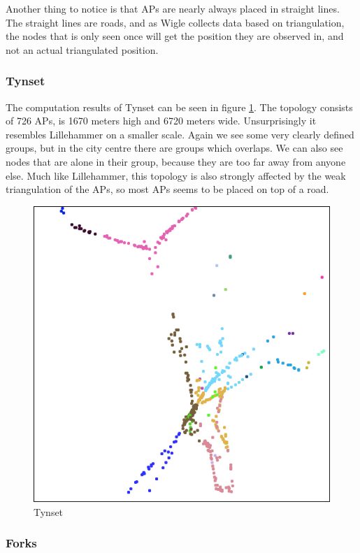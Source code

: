 Another thing to notice is that APs are nearly always placed in straight lines.
The straight lines are roads, and as Wigle collects data based on triangulation, the nodes
that is only seen once will get the position they are observed in, and not an actual
triangulated position. 
\subsubsection{Tynset}
The computation results of Tynset can be seen in figure \ref{fig:tynset_topo}. 
The topology consists of 726 APs, is 1670 meters high and  6720 meters wide. 
Unsurprisingly it resembles Lillehammer on a smaller scale.
Again we see
some very clearly defined groups, but in the city centre there are groups
which overlaps. We can also see nodes that are alone in their group,
because they are too far away from anyone else.
Much like Lillehammer, this topology is also strongly affected by the weak
triangulation of the APs, so most APs seems to be placed on top of a road. 

\begin{figure}
\center
\includegraphics[scale=0.46]{Images/cities/tynset_groups.jpg}
\caption{Tynset}
\label{fig:tynset_topo}
\end{figure}

\subsubsection{Forks}

